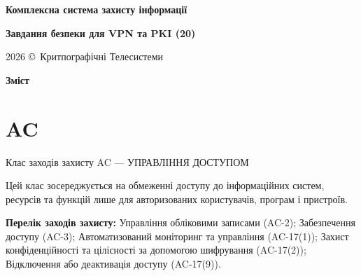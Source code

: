 \documentclass{article}
\newcommand\HUGE[1]{\fontsize{40}{40}\selectfont #1}
\begin{document}
\pagestyle{fancy}

\begin{titlepage}
  \AddToShipoutPictureBG*{\AtPageLowerLeft{\color{nato}\rule{\paperwidth}{\paperheight}}}
  \color{white}\thispagestyle{empty}\vspace*{2cm}\centering
  {\Huge  \textbf{Комплексна система захисту інформації} \par} \vspace{1cm}
  {\HUGE  \textbf{Завдання безпеки для VPN та PKI (20)} \par} \vspace{1cm}
  \vfill
  {\large 2026 \copyright\ Критпографічні Телесистеми \par}
\end{titlepage}

\newpage

\begin{center}
  {\Huge\color{nato}\bfseries Зміст\par}
\end{center}
\vspace{40pt}
\tableofcontents

\begin{abstract}
Завдання з безпеки для забезпечення безпеки VPN-продуктів та інфраструктури PKI (CA, OCSP, TSP, LDAP).
\end{abstract}

\section{AC}
Клас заходів захисту AC --- УПРАВЛІННЯ ДОСТУПОМ

Цей клас зосереджується на обмеженні доступу до інформаційних систем, ресурсів та функцій лише для авторизованих користувачів, програм і пристроїв.

\textbf{Перелік заходів захисту:} Управління обліковими записами (AC-2); Забезпечення доступу (AC-3); Автоматизований моніторинг та управління (AC-17(1)); Захист конфіденційності та цілісності за допомогою шифрування (AC-17(2)); Відключення або деактивація доступу (AC-17(9)).
\end{document}

